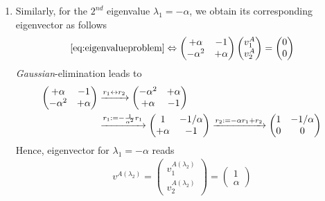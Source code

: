 \documentclass[12pt]{article}
\begin{document}
\begin{enumerate}
\begin{enumerate}
		      \item Similarly, for the $2^{nd}$ eigenvalue $\lambda_{1} = -\alpha$,
		            we obtain its corresponding eigenvector as follows
		            \begin{align}
			            \eqref{eq:eigenvalueproblem}
			            \Leftrightarrow
			            \begin{pmatrix} +\alpha &-1\\-\alpha^2 & +\alpha \end{pmatrix}
			            \begin{pmatrix} v^{A}_{1} \\ v^{A}_{2} \end{pmatrix}
			            =
			            \begin{pmatrix} 0 \\ 0 \end{pmatrix}
		            \end{align}
		            \emph{Gaussian}-elimination leads to
		            \begin{align}
			            \begin{pmatrix} +\alpha &-1\\-\alpha^2 & +\alpha \end{pmatrix}
			             & \xrightarrow{\begin{subarray}{l}r_{1} \leftrightarrow r_{2}\end{subarray}}
			            \begin{pmatrix} -\alpha^2 & +\alpha\\ +\alpha &-1 \end{pmatrix}\notag            \\
			             & \xrightarrow{\begin{subarray}{l}r_{1}:=-\frac{1}{\alpha^2} r_{1}\end{subarray}}
			            \begin{pmatrix} 1 &-1/\alpha\\+\alpha & -1 \end{pmatrix}
			            \xrightarrow{\begin{subarray}{l}r_{2}:=-\alpha r_{1}+r_{2} \end{subarray}}
			            \begin{pmatrix} 1 &-1/\alpha\\0 & 0 \end{pmatrix}
		            \end{align}
		            Hence, eigenvector for $\lambda_{1} = -\alpha$ reads
		            \begin{align}
			            v^{A(\lambda_{2})}
			            =\begin{pmatrix} v^{A(\lambda_{2})}_{1}\\v^{A(\lambda_{2})}_{2} \end{pmatrix}
			            =\begin{pmatrix} 1\\ \alpha \end{pmatrix}

\end{align}
\end{enumerate}
\end{enumerate}
\end{document}
